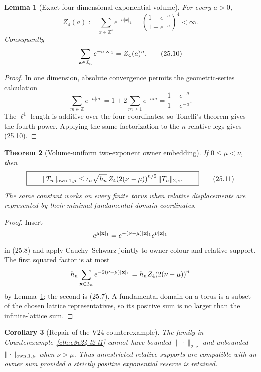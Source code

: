\documentclass[11pt,oneside]{book}
\newtheorem{theorem}{Theorem}[chapter]
\newtheorem{lemma}[theorem]{Lemma}
\newtheorem{corollary}[theorem]{Corollary}
\theoremstyle{definition}
\theoremstyle{remark}
\begin{document}
\begin{lemma}[Exact four-dimensional exponential volume]
\label{lem:e8v25-Z4}
For every \(a>0\),
\[
\boxed{\qquad
 Z_4(a):=\sum_{x\in{\mathbb Z}^4}e^{-a|x|_1}
       =\left(\frac{1+e^{-a}}{1-e^{-a}}\right)^4<\infty .
\qquad}                                                          \tag{25.9}
\]
Consequently
\[
 \sum_{{\bf x}\in{\cal I}_n}e^{-a|{\bf x}|_1}=Z_4(a)^n.           \tag{25.10}
\]
\end{lemma}

\begin{proof}
In one dimension, absolute convergence permits the geometric-series
calculation
\[
 \sum_{m\in{\mathbb Z}}e^{-a|m|}
 =1+2\sum_{m\geq1}e^{-am}
 =\frac{1+e^{-a}}{1-e^{-a}}.
\]
The \(\ell^1\) length is additive over the four coordinates, so Tonelli's
theorem gives the fourth power.  Applying the same factorization to the
\(n\) relative legs gives (25.10).
\end{proof}

\begin{theorem}[Volume-uniform two-exponent owner embedding]
\label{thm:e8v25-embedding}
If \(0\leq\mu<\nu\), then
\[
\boxed{\qquad
 \|T_n\|_{{\rm own},1,\mu}
 \leq
 \iota_n\sqrt{h_n}\,
 Z_4\!\left(2(\nu-\mu)\right)^{n/2}
 \|T_n\|_{2,\nu}.
\qquad}                                                          \tag{25.11}
\]
The same constant works on every finite torus when relative
displacements are represented by their minimal fundamental-domain
coordinates.
\end{theorem}

\begin{proof}
Insert
\[
 e^{\mu|{\bf x}|_1}
 =e^{-(\nu-\mu)|{\bf x}|_1}e^{\nu|{\bf x}|_1}
\]
in (25.8) and apply Cauchy--Schwarz jointly to owner colour and relative
support.  The first squared factor is at most
\[
 h_n\sum_{{\bf x}\in{\cal I}_n}
       e^{-2(\nu-\mu)|{\bf x}|_1}
 =h_n Z_4\!\left(2(\nu-\mu)\right)^n
\]
by Lemma~\ref{lem:e8v25-Z4}; the second is (25.7).  A fundamental
domain on a torus is a subset of the chosen lattice representatives,
so its positive sum is no larger than the infinite-lattice sum.
\end{proof}

\begin{corollary}[Repair of the V24 counterexample]
\label{cor:e8v25-counterexample-repair}
The family in Counterexample~\ref{cth:e8v24-l2-l1} cannot have bounded
\(\|\cdot\|_{2,\nu}\) and unbounded
\(\|\cdot\|_{{\rm own},1,\mu}\) when \(\nu>\mu\).
Thus unrestricted relative supports are compatible with an owner sum
provided a strictly positive exponential reserve is retained.
\end{corollary}
\end{document}
